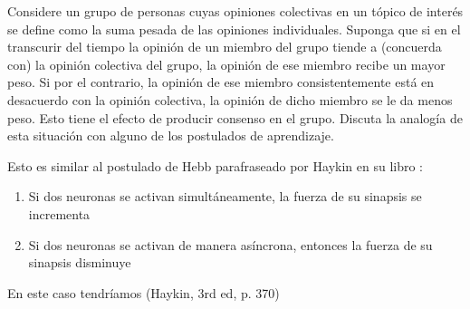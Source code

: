 \documentclass[11pt,spanish,answers]{exam}
\begin{document}
\begin{questions}
\begin{solution}
    \end{solution}

\question
Considere un grupo de personas cuyas opiniones colectivas en un tópico de interés se define como la suma pesada de las opiniones individuales. Suponga que si en el transcurir del tiempo la opinión de un miembro del grupo tiende a (concuerda con) la opinión colectiva del grupo, la opinión de ese miembro recibe un mayor peso. Si por el contrario, la opinión de ese miembro consistentemente está en desacuerdo con la opinión  colectiva, la opinión de dicho miembro se le da menos peso. Esto tiene el efecto de producir consenso en el grupo. Discuta la analogía de esta situación con alguno de
los postulados de aprendizaje.

    \begin{solution}
        Esto es similar al postulado de Hebb parafraseado por Haykin en su libro \cite{postuladoDeHebb}:
        
        \begin{enumerate}
          \item Si dos neuronas se activan simultáneamente, la fuerza de su sinapsis se incrementa
          \item Si dos neuronas se activan de manera asíncrona, entonces la fuerza de su sinapsis disminuye
        \end{enumerate}
        
        En este caso tendríamos (Haykin, 3rd ed, p. 370)
        
        \begin{center}      

\end{center}
\end{solution}
\end{questions}
\end{document}
